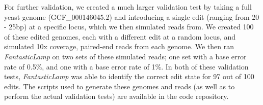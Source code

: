 \documentclass{bioinfo}
\theoremstyle{definition}
\begin{document}
For further validation, we created a much larger validation test by taking a full yeast genome (GCF\_000146045.2) and introducing a single edit (ranging from 20 - 25bp) at a specific locus, which we then simulated reads from.
We created 100 of these edited genomes, each with a different edit at a random locus, and simulated 10x coverage, paired-end reads from each genome.
We then ran \textit{FantasticLamp} on two sets of these simulated reads; one set with a base error rate of 0.5\%, and one with a base error rate of 1\%.
In both of these validation tests, \textit{FantasticLamp} was able to identify the correct edit state for 97 out of 100 edits.
The scripts used to generate these genomes and reads (as well as to perform the actual validation tests) are available in the code repository.


%
\end{document}
